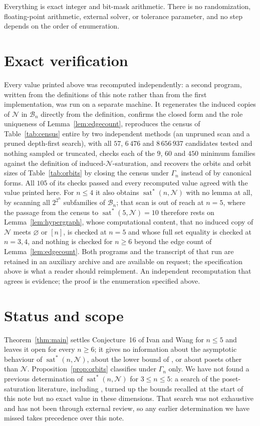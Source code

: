 \documentclass[11pt]{amsart}
\newcommand{\Bn}{\mathcal B_n}
\newcommand{\Nposet}{\mathcal N}
\newcommand{\satstar}{\operatorname{sat}^{*}}
\begin{document}
Everything is exact integer and bit-mask arithmetic. There is no randomization,
floating-point arithmetic, external solver, or tolerance parameter, and no step
depends on the order of enumeration.

\section*{Exact verification}

Every value printed above was recomputed independently: a second program,
written from the definitions of this note rather than from the first
implementation, was run on a separate machine. It regenerates the induced
copies of $\Nposet$ in $\Bn$ directly from the definition, confirms the closed
form and the role uniqueness of Lemma~\ref{lem:edgecount}, reproduces the
census of Table~\ref{tab:census} entire by two independent methods (an
unpruned scan and a pruned depth-first search), with all $57$, $6\,476$ and
$8\,656\,937$ candidates tested and nothing sampled or truncated, checks each
of the $9$, $60$ and $450$ minimum families against the definition of
induced-$\Nposet$-saturation, and recovers the orbits and orbit sizes of
Table~\ref{tab:orbits} by closing the census under $\Gamma_n$ instead of by
canonical forms. All $105$ of its checks passed and every recomputed value
agreed with the value printed here. For $n\leq 4$ it also obtains
$\satstar(n,\Nposet)$ with no lemma at all, by scanning all $2^{2^n}$
subfamilies of $\Bn$; that scan is out of reach at $n=5$, where the passage
from the census to $\satstar(5,\Nposet)=10$ therefore rests on
Lemma~\ref{lem:hypergraph}, whose computational content, that no induced copy
of $\Nposet$ meets $\varnothing$ or $[n]$, is checked at $n=5$ and whose full
set equality is checked at $n=3,4$, and nothing is checked for $n\geq 6$
beyond the edge count of Lemma~\ref{lem:edgecount}. Both programs and the
transcript of that run are retained in an auxiliary archive and are available
on request; the specification above is what a reader should reimplement. An
independent recomputation that agrees is evidence; the proof is the enumeration
specified above.

\section*{Status and scope}

Theorem~\ref{thm:main} settles Conjecture~16 of Ivan and Wang for
$n\leq 5$ and leaves it open for every $n\geq 6$; it gives no information about
the asymptotic behaviour of $\satstar(n,\Nposet)$, about the lower bound of
\cite[Theorem~12]{IvanWang}, or about posets other than $\Nposet$.
Proposition~\ref{prop:orbits} classifies under $\Gamma_n$ only. We have not
found a previous determination of $\satstar(n,\Nposet)$ for $3\leq n\leq 5$:
a search of the poset-saturation literature, including
\cite{FerraraEtAl,IvanWang,MartinVeldt}, turned up the bounds recalled at the
start of this note but no exact value in these dimensions. That search was not
exhaustive and has not been through external review, so any earlier
determination we have missed takes precedence over this note.
\end{document}
